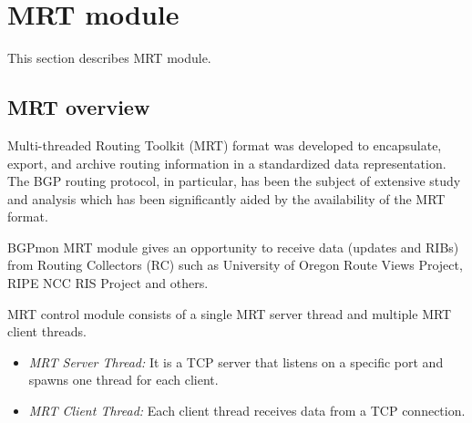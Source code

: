 \section{MRT module}
\label{sec:mrt}

This section describes MRT module.

\subsection{MRT overview}
Multi-threaded Routing Toolkit (MRT) format was developed to encapsulate, export, and archive routing information in a standardized data representation.  The BGP routing protocol, in particular, has been the subject of extensive study and analysis which has been significantly aided by the availability of the MRT format. 

BGPmon MRT module gives an opportunity to receive data (updates and RIBs) from Routing Collectors (RC) such as University of Oregon Route Views Project\cite{routeviews}, RIPE NCC RIS Project\cite{riperis} and others.

MRT control module consists of a single MRT server thread and multiple MRT client threads.
\begin{itemize}
\item{\emph{MRT Server Thread:} It is a TCP server that listens on a specific port and spawns one thread for each client. }
\item{\emph{MRT Client Thread:} Each client thread receives data from a TCP connection.}
\end{itemize}

